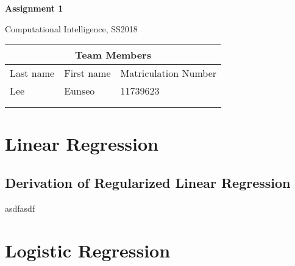 \documentclass[a4paper]{article}
\begin{document}
\begin{titlepage}
	\centering
	{\huge \bf Assignment 1\par}
	\vspace{1cm}
	{\Large Computational Intelligence, SS2018\par}
	\vspace{1cm}
	\begin{tabular}{|l|l|l|}
	\hline
	\multicolumn{3}{|c|}{\textbf{Team Members}}   \\ \hline
	Last name & First name & Matriculation Number \\ \hline
	Lee       & Eunseo     & 11739623             \\ \hline
	          &            &                      \\ \hline
	          &            &                      \\ \hline
	\end{tabular}
\end{titlepage}

\section{Linear Regression}
\subsection{Derivation of Regularized Linear Regression}
asdfasdf

\section{Logistic Regression}
\end{document}
